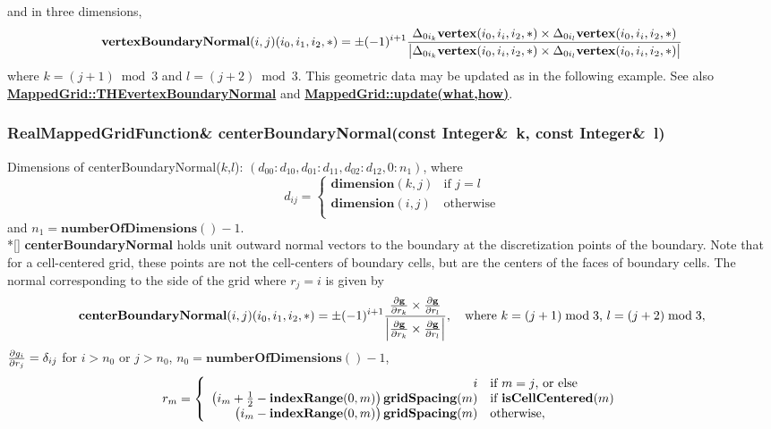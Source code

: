 \documentclass{article}
\begin{document}
    and in three dimensions,
    \[
      \textbf{vertexBoundaryNormal}(i,j)(i_0,i_1,i_2,\ast) = \pm (-1)^{i+1}
           {\Delta_{0i_k} \textbf{vertex}(i_0,i_i,i_2,\ast) \times \Delta_{0i_l} \textbf{vertex}(i_0,i_i,i_2,\ast) \over
      \big| \Delta_{0i_k} \textbf{vertex}(i_0,i_i,i_2,\ast) \times \Delta_{0i_l} \textbf{vertex}(i_0,i_i,i_2,\ast) \big|}
    \]
    where $k=(j+1)\bmod3$ and $l=(j+2)\bmod3$.
    This geometric data may be updated as in the following example.
    See also {\bf{}\hyperref{THEvertexBoundaryNormal}{THEvertexBoundaryNormal \rm(\S}{)}{MappedGrid::THEvertexBoundaryNormal}}
    and {\bf{}\hyperref{update(what,how)}{update(what,how) \rm(\S}{)}{MappedGrid::update(what,how)}}.

  \subsubsection{RealMappedGridFunction\& centerBoundaryNormal(const Integer\&~k, const Integer\&~l)}
  \label{MappedGrid::centerBoundaryNormal(k,l)}
    Dimensions of centerBoundaryNormal($k$,$l$): $(d_{00}\colon d_{10},d_{01}\colon d_{11},d_{02}\colon d_{12},0\colon n_1)$,
    where \[d_{ij} = \left\{ \begin{array}{ll}
      \textbf{dimension}(k,j) & \mbox{if $j=l$}  \\
      \textbf{dimension}(i,j) & \mbox{otherwise} \\
    \end{array} \right. \]
    and $n_1 = \textbf{numberOfDimensions}() - 1$. \\*[\parskip]
    \textbf{centerBoundaryNormal} holds unit outward normal vectors to the boundary at the discretization points of the boundary.
    Note that for a cell-centered grid, these points are not the cell-centers of boundary cells, but are the centers of the faces
    of boundary cells.  The normal corresponding to the side of the grid where $r_j=i$ is given by
    \[
      \textbf{centerBoundaryNormal}(i,j)(i_0,i_1,i_2,\ast) = \pm (-1)^{i+1}
      {{\partial \textbf{g} \over \partial r_k} \times {\partial \textbf{g} \over \partial r_l} \over
      \Big|{\partial \textbf{g} \over \partial r_k} \times {\partial \textbf{g} \over \partial r_l}\Big|},
      \quad\mbox{where $k=(j+1)\bmod3$, $l=(j+2)\bmod3$},
    \]
    ${\partial g_i \over \partial r_j} = \delta_{ij}$ for $i>n_0$ or $j>n_0$, $n_0=\textbf{numberOfDimensions}()-1$,
    \[
      r_m = \left\{ \begin{array}{rl}
        i                                                                                   & \mbox{if $m=j$, or else}         \\
        \big(i_m + {1\over2} - \textbf{indexRange}(0,m)\big)\,\textbf{gridSpacing}(m) & \mbox{if \bf{}isCellCentered}(m) \\
        \big(i_m             - \textbf{indexRange}(0,m)\big)\,\textbf{gridSpacing}(m) & \mbox{otherwise},                \\
      \end{array} \right.
    \]
\end{document}
